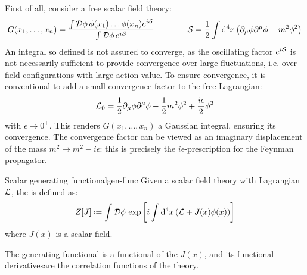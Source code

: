 First of all, consider a free scalar field theory:
\begin{equation*}
  G(x_1, \dots, x_n) = \frac{\int \mathcal{D}\phi\, \phi(x_1) \dots \phi(x_n) e^{i\mathcal{S}}}{\int \mathcal{D}\phi\, e^{i\mathcal{S}}}
  \qquad \qquad
  \mathcal{S} = \frac{1}{2} \int \mathrm{d}^4x \left( \partial_\mu \phi \partial^\mu \phi - m^2 \phi^2 \right)
\end{equation*}
An integral so defined is not assured to converge, as the oscillating factor $ e^{i\mathcal{S}} $ is not necessarily sufficient to provide convergence over large fluctuations, i.e. over field configurations with large action value. To ensure convergence, it is conventional to add a small convergence factor to the free Lagrangian:
\begin{equation}
  \mathcal{L}_0 = \frac{1}{2} \partial_\mu \phi \partial^\mu \phi - \frac{1}{2} m^2 \phi^2 + \frac{i \epsilon}{2} \phi^2
\end{equation}
with $ \epsilon \rightarrow 0^+ $. This renders $ G(x_1, \dots, x_n) $ a Gaussian integral, ensuring its convergence. The convergence factor can be viewed as an imaginary displacement of the mass $ m^2 \mapsto m^2 - i \epsilon $: this is precisely the $ i\epsilon $-prescription for the Feynman propagator.

\begin{definition}{Scalar generating functional}{gen-func}
  Given a scalar field theory with Lagrangian $ \mathcal{L} $, the  is defined as:
  \begin{equation}
    Z[J] \defeq \int \mathcal{D}\phi\, \exp\left[ i \int \dd^4x \left( \lag + J(x) \phi(x) \right) \right]
  \end{equation}
  where $ J(x) $ is a scalar field.
\end{definition}

The generating functional is a functional of the  $ J(x) $, and its functional derivatives\footnotemark are the correlation functions of the theory.


